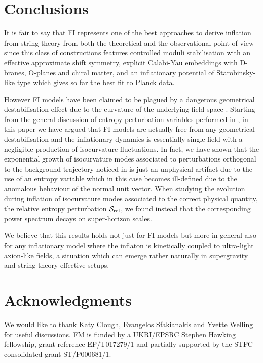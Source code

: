 \documentclass[aps,prd,a4paper,twocolumn,amsmath,showpacs,superscriptaddress,nofootinbib,preprintnumbers]{revtex4-1}
\newcommand{\mc}{\mathcal}
\begin{document}
\section{Conclusions}
\label{Conclusions}

It is fair to say that FI represents one of the best approaches to derive inflation from string theory from both the theoretical and the observational point of view since this class of constructions features controlled moduli stabilisation with an effective approximate shift symmetry, explicit Calabi-Yau embeddings with D-branes, O-planes and chiral matter, and an inflationary potential of Starobinsky-like type which gives so far the best fit to Planck data.

However FI models have been claimed to be plagued by a dangerous geometrical destabilisation effect due to the curvature of the underlying field space \cite{Cicoli:2018ccr}. Starting from the general discussion of entropy perturbation variables performed in \cite{Cicoli:2021yhb}, in this paper we have argued that FI models are actually free from any geometrical destabilisation and the inflationary dynamics is essentially single-field with a negligible production of isocurvature fluctuations. In fact, we have shown that the exponential growth of isocurvature modes associated to perturbations orthogonal to the background trajectory noticed in \cite{Cicoli:2018ccr} is just an unphysical artifact due to the use of an entropy variable which in this case becomes ill-defined due to the anomalous behaviour of the normal unit vector. When studying the evolution during inflation of isocurvature modes associated to the correct physical quantity, the relative entropy perturbation $\mc{S}_{\rm rel}$, we found instead that the corresponding power spectrum decays on super-horizon scales.

We believe that this results holds not just for FI models but more in general also for any inflationary model where the inflaton is kinetically coupled to ultra-light axion-like fields, a situation which can emerge rather naturally in supergravity and string theory effective setups.








\section*{Acknowledgments}

We would like to thank Katy Clough, Evangelos Sfakianakis and Yvette Welling for useful discussions. FM is funded by a UKRI/EPSRC Stephen Hawking fellowship, grant reference
EP/T017279/1 and partially supported by the STFC consolidated grant ST/P000681/1.
\end{document}
